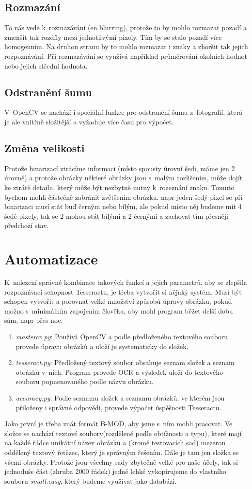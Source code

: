 \documentclass[12pt]{report}			%
\begin{document}
	\subsection{Rozmazání}
	To nás vede k~rozmazávání (\gls{en} blurring), protože to by mohlo rozmazat pozadí a zmenšit tak rozdíly mezi jednotlivými pixely. Tím by se stalo pozadí více homogenním. Na druhou stranu by to mohlo rozmazat i znaky a zhoršit tak jejich rozpoznávání. Při rozmazávání se využívá například průměrování okolních hodnot nebo jejich střední hodnota.
	\subsection{Odstranění šumu}
	V~OpenCV se nachází i speciální funkce pro odstranění šumu z~fotografií, která je ale vnitřně složitější a vyžaduje více času pro výpočet.
	\subsection{Změna velikosti}
	Protože binarizací ztrácíme informaci (místo spousty úrovní šedi, máme jen 2 úrovně) a protože obrázky některé obrázky jsou s~malým rozlišením, může dojít ke ztrátě detailu, který může být nezbytně nutný k~rozeznání znaku. Tomuto bychom mohli částečně zabránit zvětšením obrázku. \Gls{napr} jeden šedý pixel se při binarizaci musí stát buď černým nebo bílým, ale pokud místo něj budeme mít 4 šedé pixely, tak se 2 mohou stát bílými a 2 černými a zachovat tím přesněji předchozí stav.
	\section{Automatizace}
	K~nalezení správné kombinace takových funkcí a jejich parametrů, aby se zlepšila rozpoznávací schopnost Tesseractu, je třeba vytvořit si nějaký systém. Musí být schopen vytvořit a porovnat velké množství způsobů úpravy obrázku, pokud možno s~minimálním zapojením člověka, aby mohl program běžet delší dobu sám, \gls{napr} přes noc.
	\begin{enumerate}
	\item{\emph{mastercv.py}: Používá OpenCV a podle předloženého textového souboru provede úpravu obrázků a uloží je systematicky do složek.}
	\item{\emph{tesseract.py}: Předložený textový soubor obsahuje seznam složek a seznam obrázků v~nich. Program provede \gls{OCR} a výsledek uloží do textového souboru pojmenovaného podle názvu obrázku. }
	\item{\emph{accuracy.py}: Podle seznamu složek a seznamu obrázků, ve kterém jsou přiloženy i správné odpovědi, provede výpočet úspěšnosti Tesseractu.}
	\end{enumerate}
	Jako první je třeba znát formát \gls{B-MOD}, aby jsme s~ním mohli pracovat. Ve složce se nachází textové soubory(rozdělené podle obtížnosti a typu), které mají na každé řádce unikátní název obrázku a (kromě testovacích sad) mezerou oddělený textový řetězec, který je správným řešením. Dále je tam jen složka se všemi obrázky. Protože jsou všechny sady zbytečně velké pro naše účely, tak si jednoduše část (zhruba 2000 řádek) jedné lehké vykopírujeme do vlastního souboru \emph{small.easy}, který budeme využívat jako databázi.
\end{document}
